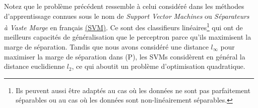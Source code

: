 \documentclass[a4paper,francais]{article}
\theoremstyle{definition}
\begin{document}
Notez que le problème précédent ressemble à celui considéré dans les
méthodes d'apprentissage connues sous le nom de \emph{Support Vector Machines}
ou \emph{Séparateurs à Vaste Marge} en français
\href{https://en.wikipedia.org/wiki/Support-vector_machine}{(SVM)}.
Ce sont des classifieurs linéaires\footnote{Ils peuvent aussi être adaptés
au cas où les données ne sont pas parfaitement séparables ou au cas où les données
sont non-linéairement séparables.} 
qui ont de meilleurs capacités de généralisation que le perceptron 
parce qu'ils maximisent la marge de séparation. Tandis que nous avons
considéré une distance $l_\infty$ pour maximiser la marge de séparation
dans (P), les SVMs considèrent en général la distance euclidienne $l_2$,
ce qui aboutit un problème d'optimisation quadratique. 
\end{document}
